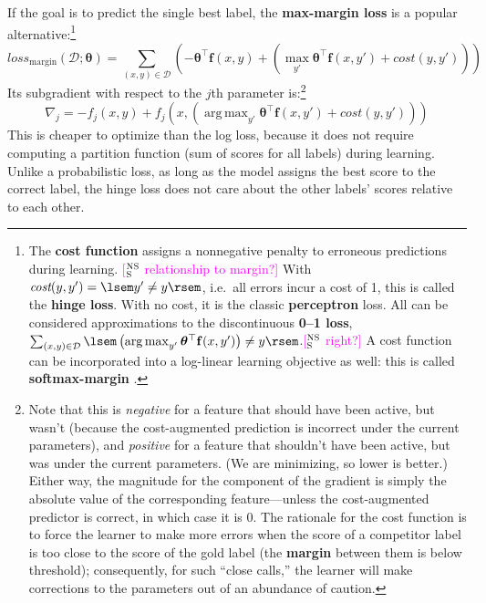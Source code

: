 \documentclass[11pt,letterpaper]{article}
\DeclareMathOperator*{\argmax}{arg\,max}
\newcommand{\ensuretext}[1]{#1}
\newcommand{\nssmarker}{\ensuretext{\textcolor{magenta}{\ensuremath{^{\textsc{NS}}_{\textsc{S}}}}}}
\newcommand{\arkcomment}[3]{\ensuretext{\textcolor{#3}{[#1 #2]}}}
\newcommand{\nss}[1]{\arkcomment{\nssmarker}{#1}{magenta}}
\begin{document}
If the goal is to predict the single best label, the \textbf{max-margin loss} is a popular alternative:\footnote{The \textbf{cost function} assigns a nonnegative penalty to erroneous predictions during learning.
\nss{relationship to margin?} 
With $\textit{cost}(y,y')=\lsem y'\neq y\rsem$, i.e.~all errors incur a cost of 1, this is called the \textbf{hinge loss}. 
With no cost, it is the classic \textbf{perceptron} loss.
All can be considered approximations to the discontinuous \textbf{0--1 loss},
$\sum_{(x,y)\in\mathcal{D}}{\lsem \left(\argmax_{y'}{\boldsymbol{\theta}^\top\mathbf{f}(x,y')}\right)\neq y \rsem}$.\nss{right?}
A cost function can be incorporated into a log-linear learning objective as well: this is called \textbf{softmax-margin} \citep{gimpel-10}.}
\begin{equation}
\textit{loss}_\text{margin}(\mathcal{D}; \boldsymbol{\theta}) = \sum_{(x,y)\in\mathcal{D}}{\left(- \boldsymbol{\theta}^\top\mathbf{f}(x,y) + \left(\max_{y'}{\boldsymbol{\theta}^\top\mathbf{f}(x,y') + \textit{cost}(y,y')}\right)\right)} 
\end{equation}
Its subgradient with respect to the $j$th parameter is:\footnote{Note that this is {\em negative} 
for a feature that should have been active, but wasn't 
(because the cost-augmented prediction is incorrect under the current parameters), 
and {\em positive} for a feature that shouldn't have been active, but was under the current parameters.
(We are minimizing, so lower is better.)
Either way, the magnitude for the component of the gradient is simply the absolute value of the corresponding 
feature---unless the cost-augmented predictor is correct, in which case it is 0. 
The rationale for the cost function is to force the learner to make more errors when the score of a competitor label 
is too close to the score of the gold label (the \textbf{margin} between them is below threshold);
consequently, for such ``close calls,'' the learner will make corrections to the parameters out of an abundance of caution.}
\begin{equation}
\nabla_j = -f_j(x,y) + f_j(x,\left(\argmax_{y'}{\boldsymbol{\theta}^\top\mathbf{f}(x,y')+cost(y,y')}\right))
\end{equation}
This is cheaper to optimize than the log loss, because it does not require computing a partition function 
(sum of scores for all labels) during learning.
Unlike a probabilistic loss, as long as the model assigns the best score to the correct label, 
the hinge loss does not care about the other labels' scores relative to each other. 
\end{document}
